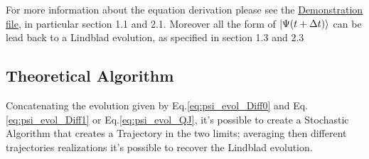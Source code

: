 \documentclass[a4paper,12pt]{article}
\begin{document}
	For more information about the equation derivation please see the \href{run:./Demonstration.pdf}{Demonstration file}, in particular section 1.1 and 2.1. Moreover all the form of $ \ket{\Psi (t + \Delta t) } $ can be lead back to a Lindblad evolution, as specified in section 1.3 and 2.3

	\subsection{Theoretical Algorithm}
	\label{sub:theoretical_algorithm}
	Concatenating the evolution given by Eq.\ref{eq:psi_evol_Diff0} and Eq.\ref{eq:psi_evol_Diff1} or Eq.\ref{eq:psi_evol_QJ}, it's possible to create a Stochastic Algorithm that creates a Trajectory in the two limits; averaging then different trajectories realizations it's possible to recover the Lindblad evolution.
\end{document}

